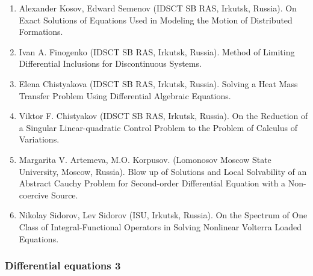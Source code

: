 \documentclass[
]{article}
\providecommand{\tightlist}{%
  \setlength{\itemsep}{0pt}\setlength{\parskip}{0pt}}
\begin{document}
\begin{enumerate}
\def\labelenumi{\arabic{enumi}.}
\tightlist
\item
  Alexander Kosov, Edward Semenov (IDSCT SB RAS, Irkutsk, Russia). On
  Exact Solutions of Equations Used in Modeling the Motion of
  Distributed Formations.
\item
  Ivan A. Finogenko (IDSCT SB RAS, Irkutsk, Russia). Method of Limiting
  Differential Inclusions for Discontinuous Systems.
\item
  Elena Chistyakova (IDSCT SB RAS, Irkutsk, Russia). Solving a Heat Mass
  Transfer Problem Using Differential Algebraic Equations.
\item
  Viktor F. Chistyakov (IDSCT SB RAS, Irkutsk, Russia). On the Reduction
  of a Singular Linear-quadratic Control Problem to the Problem of
  Calculus of Variations.
\item
  Margarita V. Artemeva, M.O. Korpusov. (Lomonosov Moscow State
  University, Moscow, Russia). Blow up of Solutions and Local
  Solvability of an Abstract Cauchy Problem for Second-order
  Differential Equation with a Non-coercive Source.
\item
  Nikolay Sidorov, Lev Sidorov (ISU, Irkutsk, Russia). On the Spectrum
  of One Class of Integral-Functional Operators in Solving Nonlinear
  Volterra Loaded Equations.
\end{enumerate}

\hypertarget{de3}{%
\subsubsection{Differential equations 3}\label{de3}}
\end{document}
